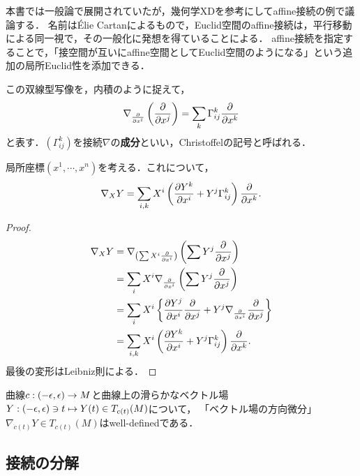 \documentclass[uplatex,dvipdfmx]{jsreport}
\begin{document}
\begin{tcolorbox}[colframe=ForestGreen, colback=ForestGreen!10!white,breakable,colbacktitle=ForestGreen!40!white,coltitle=black,fonttitle=\bfseries\sffamily,
title=affine接続とは「ベクトル場のベクトル場に沿った方向微分」]
    本書では一般論で展開されていたが，幾何学XDを参考にしてaffine接続の例で議論する．
    名前はÉlie Cartanによるもので，Euclid空間のaffine接続は，平行移動による同一視で，その一般化に発想を得ていることによる．
    affine接続を指定することで，「接空間が互いにaffine空間としてEuclid空間のようになる」という追加の局所Euclid性を添加できる．
\end{tcolorbox}

\begin{definition}
    この双線型写像を，内積のように捉えて，
    \[\nabla_{\frac{\partial }{\partial x^i}}\left(\frac{\partial }{\partial x^j}\right)=\sum_{k}\Gamma^k_{ij}\frac{\partial }{\partial x^k}\]
    と表す．$(\Gamma^k_{ij})$を接続$\nabla$の\textbf{成分}といい，Christoffelの記号と呼ばれる．
\end{definition}

\begin{theorem}
    局所座標$(x^1,\cdots,x^n)$を考える．これについて，
    \[\nabla_XY=\sum_{i,k}X^i\left(\frac{\partial Y^k}{\partial x^i}+Y^j\Gamma^k_{ij}\right)\frac{\partial }{\partial x^k}.\]
\end{theorem}
\begin{proof}
    \begin{align*}
        \nabla_XY&=\nabla_{\left(\sum X^i\frac{\partial }{\partial x^i}\right)}\left(\sum Y^j\frac{\partial }{\partial x^j}\right)\\
        &=\sum_iX^i\nabla_{\frac{\partial }{\partial x^i}}\left(\sum Y^j\frac{\partial }{\partial x^j}\right)\\
        &=\sum_iX^i\left\{\frac{\partial Y^j}{\partial x^i}\frac{\partial }{\partial x^j}+Y^j\nabla_{\frac{\partial }{\partial x^i}}\frac{\partial }{\partial x^j}\right\}\\
        &=\sum_{i,k}X^i\left(\frac{\partial Y^k}{\partial x^i}+Y^j\Gamma^k_{ij}\right)\frac{\partial }{\partial x^k}.
    \end{align*}
    最後の変形はLeibniz則による．
\end{proof}

\begin{corollary}
    曲線$c:(-\epsilon,\epsilon)\to M$と曲線上の滑らかなベクトル場$Y:(-\epsilon,\epsilon)\ni t\mapsto Y(t)\in T_{c(t)}(M)$について，
    「ベクトル場の方向微分」$\nabla_{\dot{c}(t)}Y\in T_{c(t)}(M)$はwell-definedである．
\end{corollary}

\subsection{接続の分解}
\end{document}
